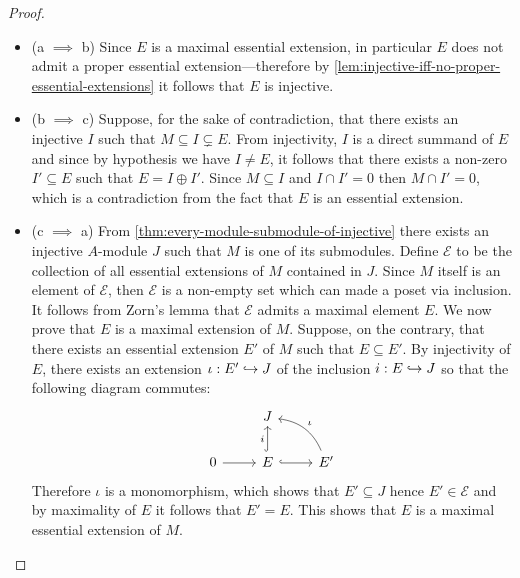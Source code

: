 \begin{proof}
\begin{itemize}\setlength\itemsep{0em}
\item (a \(\implies\) b) Since \(E\) is a maximal essential extension, in
  particular \(E\) does not admit a proper essential extension---therefore by
  \cref{lem:injective-iff-no-proper-essential-extensions} it follows that \(E\)
  is injective.

\item (b \(\implies\) c) Suppose, for the sake of contradiction, that there
  exists an injective \(I\) such that \(M \subseteq I \subsetneq E\). From injectivity,
  \(I\) is a direct summand of \(E\) and since by hypothesis we have
  \(I \neq E\), it follows that there exists a non-zero \(I' \subseteq E\) such that
  \(E = I \oplus I'\). Since \(M \subseteq I\) and \(I \cap I' = 0\) then \(M \cap I' = 0\), which
  is a contradiction from the fact that \(E\) is an essential extension.

\item (c \(\implies\) a) From \cref{thm:every-module-submodule-of-injective}
  there exists an injective \(A\)-module \(J\) such that \(M\) is one of its
  submodules. Define \(\mathcal{E}\) to be the collection of all essential extensions of
  \(M\) contained in \(J\). Since \(M\) itself is an element of \(\mathcal{E}\), then
  \(\mathcal{E}\) is a non-empty set which can made a poset via inclusion. It follows from
  Zorn's lemma that \(\mathcal{E}\) admits a maximal element \(E\). We now prove that
  \(E\) is a maximal extension of \(M\). Suppose, on the contrary, that there
  exists an essential extension \(E'\) of \(M\) such that \(E \subseteq E'\). By
  injectivity of \(E\), there exists an extension \(\iota: E' \hookrightarrow J\) of the
  inclusion \(i: E \hookrightarrow J\) so that the following diagram commutes:
  \[
  \begin{tikzcd}
  &J &\\
  0 \ar[r]
  &E \ar[r, hook] \ar[u, "i", hook]
  & E' \ar[ul, bend right, "\iota"']
  \end{tikzcd}
  \]
  Therefore \(\iota\) is a monomorphism, which shows that \(E' \subseteq J\) hence
  \(E' \in \mathcal{E}\) and by maximality of \(E\) it follows that \(E' = E\). This shows
  that \(E\) is a maximal essential extension of \(M\).
\end{itemize}
\end{proof}




